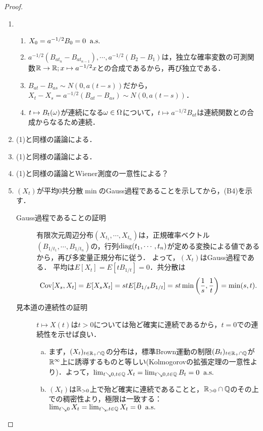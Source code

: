 \documentclass[uplatex,dvipdfmx]{jsreport}
\begin{document}
\begin{proof}\mbox{}
    \begin{enumerate}
        \item \begin{enumerate}[({B}1)]
            \item $X_0=a^{-1/2}B_0=0\;\;\mathrm{a.s.}$
            \item $a^{-1/2}(B_{at_n}-B_{at_{n-1}}),\cdots,a^{-1/2}(B_{2}-B_{1})$は，独立な確率変数の可測関数$\mathbb{R}\to\mathbb{R};x\mapsto a^{-1/2}x$との合成であるから，再び独立である．
            \item $B_{at}-B_{as}\sim N(0,a(t-s))$だから，$X_t-X_s=a^{-1/2}(B_{at}-B_{as})\sim N(0,a(t-s))$．
            \item $t\mapsto B_t(\omega)$が連続になる$\omega\in\Omega$について，$t\mapsto a^{-1/2}B_{at}$は連続関数との合成からなるため連続．
        \end{enumerate}
        \item (1)と同様の議論による．
        \item (1)と同様の議論による．
        \item (1)と同様の議論とWiener測度の一意性による？
        \item $(X_t)$が平均$0$共分散$\min$のGauss過程であることを示してから，(B4)を示す．
        \begin{description}
            \item[Gauss過程であることの証明] 
            有限次元周辺分布$(X_{t_1},\cdots,X_{t_n})$は，正規確率ベクトル$(B_{1/t_1},\cdots,B_{1/t_n})$の，行列$\mathrm{diag}(t_1,\cdots,t_n)$が定める変換による値であるから，再び多変量正規分布に従う．
            よって，$(X_t)$はGauss過程である．
            平均は$E[X_t]=E[tB_{1/t}]=0$．共分散は
            \[\mathrm{Cov}[X_s,X_t]=E[X_sX_t]=stE[B_{1/s}B_{1/t}]=st\min\left(\frac{1}{s},\frac{1}{t}\right)=\min(s,t).\]
            \item[見本道の連続性の証明]
            $t\mapsto X(t)$は$t>0$については殆ど確実に連続であるから，$t=0$での連続性を示せば良い．
            \begin{enumerate}[(a)]
                \item まず，$(X_t)_{t\in\mathbb{R}_+\cap\mathbb{Q}}$の分布は，標準Brown運動の制限$(B_t)_{t\in\mathbb{R}_+\cap\mathbb{Q}}$が$\mathbb{R}^\infty$上に誘導するものと等しい(Kolmogorovの拡張定理の一意性より)．よって，$\lim_{t\searrow0,t\in\mathbb{Q}}X_t=\lim_{t\searrow0,t\in\mathbb{Q}}B_t=0\;\;\mathrm{a.s.}$
                \item $(X_t)$は$\mathbb{R}_{>0}$上で殆ど確実に連続であることと，$\mathbb{R}_{>0}\cap\mathbb{Q}$のその上での稠密性より，極限は一致する：$\lim_{t\searrow0}X_t=\lim_{t\searrow,t\in\mathbb{Q}}X_t=0\;\;\mathrm{a.s.}$
                

\end{enumerate}
\end{description}
\end{enumerate}
\end{proof}
\end{document}
